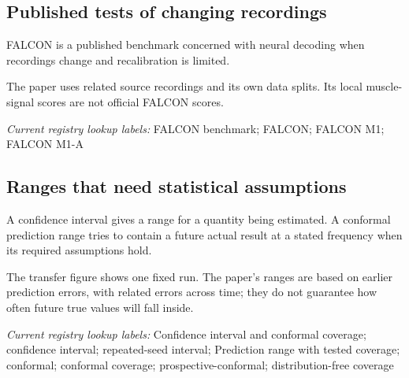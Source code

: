 \begin{samepage}
\subsection*{Published tests of changing recordings}
\noindent FALCON is a published benchmark concerned with neural decoding when recordings change and recalibration is limited.\par
\end{samepage}
\begin{samepage}
\noindent The paper uses related source recordings and its own data splits. Its local muscle-signal scores are not official FALCON scores.\par\nopagebreak[4]

\end{samepage}


\noindent\textit{Current registry lookup labels:} FALCON benchmark; FALCON; FALCON M1; FALCON M1-A\par

\begin{samepage}
\subsection*{Ranges that need statistical assumptions}
\noindent A confidence interval gives a range for a quantity being estimated. A conformal prediction range tries to contain a future actual result at a stated frequency when its required assumptions hold.\par
\end{samepage}
\begin{samepage}
\noindent The transfer figure shows one fixed run. The paper’s ranges are based on earlier prediction errors, with related errors across time; they do not guarantee how often future true values will fall inside.\par\nopagebreak[4]

\end{samepage}


\noindent\textit{Current registry lookup labels:} Confidence interval and conformal coverage; confidence interval; repeated-seed interval; Prediction range with tested coverage; conformal; conformal coverage; prospective-conformal; distribution-free coverage\par

